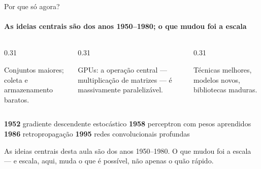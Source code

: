 \documentclass[aspectratio=169, 11pt]{beamer}
\begin{document}
\begin{frame}{Por que só agora?}
  \framesubtitle{As ideias centrais são dos anos 1950--1980; o que mudou foi a escala}

  \begin{columns}[T]
    \begin{column}{0.31\textwidth}
      \begin{tcolorbox}[iccaixa=icNeural, title={1. Dados}]
        \small Conjuntos maiores; coleta e armazenamento baratos.
      \end{tcolorbox}
    \end{column}
    \begin{column}{0.31\textwidth}
      \begin{tcolorbox}[iccaixa=icAzulClaro, title={2. Hardware}]
        \small GPUs: a operação central — multiplicação de matrizes — é
        massivamente paralelizável.
      \end{tcolorbox}
    \end{column}
    \begin{column}{0.31\textwidth}
      \begin{tcolorbox}[iccaixa=icMagenta, title={3. Software}]
        \small Técnicas melhores, modelos novos, bibliotecas maduras.
      \end{tcolorbox}
    \end{column}
  \end{columns}

  \medskip
  \begin{center}\small
    {\color{icAzul}\textbf{1952}} gradiente descendente estocástico
    \;\textbullet\;
    {\color{icAzul}\textbf{1958}} perceptron com pesos aprendidos
    \;\textbullet\;
    {\color{icAzul}\textbf{1986}} retropropagação
    \;\textbullet\;
    {\color{icAzul}\textbf{1995}} redes convolucionais profundas
  \end{center}

  \begin{alertabox}
    As ideias centrais desta aula são dos anos 1950--1980. O que mudou foi a
    escala — e escala, aqui, muda o que é possível, não apenas o quão rápido.
  \end{alertabox}
\end{frame}
\end{document}
